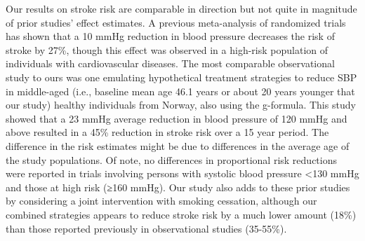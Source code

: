 \documentclass[
]{book}
\begin{document}
Our results on stroke risk are comparable in direction but not quite in magnitude of prior studies' effect estimates. A previous meta-analysis of randomized trials has shown that a 10 mmHg reduction in blood pressure decreases the risk of stroke by 27\%, though this effect was observed in a high-risk population of individuals with cardiovascular diseases\autocite{ettehad2016}. The most comparable observational study to ours was one emulating hypothetical treatment strategies to reduce SBP in middle-aged (i.e., baseline mean age 46.1 years or about 20 years younger that our study) healthy individuals from Norway, also using the g-formula. This study showed that a 23 mmHg average reduction in blood pressure of 120 mmHg and above resulted in a 45\% reduction in stroke risk over a 15 year period\autocite{vangenlonne2018}. The difference in the risk estimates might be due to differences in the average age of the study populations. Of note, no differences in proportional risk reductions were reported in trials involving persons with systolic blood pressure \textless130 mmHg and those at high risk (≥160 mmHg)\autocite{ettehad2016}. Our study also adds to these prior studies by considering a joint intervention with smoking cessation, although our combined strategies appears to reduce stroke risk by a much lower amount (18\%) than those reported previously in observational studies (35-55\%)\autocite{chiuve2008,braillon2015,zhang2012}.
\end{document}
